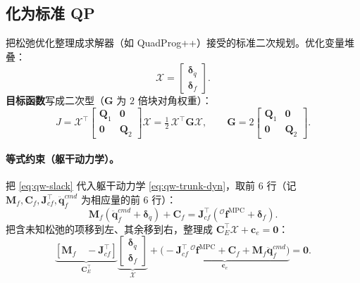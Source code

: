 \subsection{化为标准 QP}
\label{subsec:qw-standard-qp}

把松弛优化整理成求解器（如 QuadProg++）接受的标准二次规划。优化变量堆叠\cite{yu2021quadruped}：
\begin{equation}
  \boldsymbol{\mathcal{X}}=\begin{bmatrix}\boldsymbol{\delta}_{\ddot{q}}\\\boldsymbol{\delta}_f\end{bmatrix}.
  \label{eq:qw-X}
\end{equation}
\textbf{目标函数}写成二次型（$\boldsymbol{G}$ 为 $2$ 倍块对角权重）：
\begin{equation}
  J=\boldsymbol{\mathcal{X}}^\top\begin{bmatrix}\boldsymbol{Q}_1&\mathbf{0}\\\mathbf{0}&\boldsymbol{Q}_2\end{bmatrix}\boldsymbol{\mathcal{X}}
  =\tfrac12\,\boldsymbol{\mathcal{X}}^\top\boldsymbol{G}\boldsymbol{\mathcal{X}},
  \qquad
  \boldsymbol{G}=2\begin{bmatrix}\boldsymbol{Q}_1&\mathbf{0}\\\mathbf{0}&\boldsymbol{Q}_2\end{bmatrix}.
  \label{eq:qw-qp-obj}
\end{equation}

\paragraph{等式约束（躯干动力学）。}
把 \cref{eq:qw-slack} 代入躯干动力学 \cref{eq:qw-trunk-dyn}，取前 $6$ 行（记 $\boldsymbol{M}_f,\boldsymbol{C}_f,\boldsymbol{J}_{cf}^\top,\ddot{\boldsymbol{q}}_f^{cmd}$ 为相应量的前 $6$ 行）\cite{yu2021quadruped}：
\begin{equation}
  \boldsymbol{M}_f(\ddot{\boldsymbol{q}}_f^{cmd}+\boldsymbol{\delta}_{\ddot{q}})+\boldsymbol{C}_f=\boldsymbol{J}_{cf}^\top({}^{\mathcal{O}}\boldsymbol{f}^{\mathrm{MPC}}+\boldsymbol{\delta}_f).
  \label{eq:qw-eq-raw}
\end{equation}
把含未知松弛的项移到左、其余移到右，整理成 $\boldsymbol{C}_E^\top\boldsymbol{\mathcal{X}}+\boldsymbol{c}_e=\mathbf{0}$\cite{yu2021quadruped}：
\begin{equation}
  \underbrace{[\boldsymbol{M}_f\quad-\boldsymbol{J}_{cf}^\top]}_{\boldsymbol{C}_E^\top}
  \underbrace{\begin{bmatrix}\boldsymbol{\delta}_{\ddot{q}}\\\boldsymbol{\delta}_f\end{bmatrix}}_{\boldsymbol{\mathcal{X}}}
  +\underbrace{\big(-\boldsymbol{J}_{cf}^\top\,{}^{\mathcal{O}}\boldsymbol{f}^{\mathrm{MPC}}+\boldsymbol{C}_f+\boldsymbol{M}_f\ddot{\boldsymbol{q}}_f^{cmd}\big)}_{\boldsymbol{c}_e}=\mathbf{0}.
  \label{eq:qw-eq-std}
\end{equation}

